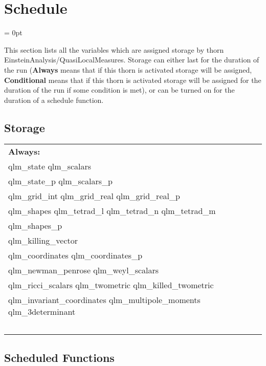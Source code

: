
\section{Schedule} 


\parskip = 0pt


\noindent This section lists all the variables which are assigned storage by thorn EinsteinAnalysis/QuasiLocalMeasures.  Storage can either last for the duration of the run ({\bf Always} means that if this thorn is activated storage will be assigned, {\bf Conditional} means that if this thorn is activated storage will be assigned for the duration of the run if some condition is met), or can be turned on for the duration of a schedule function.


\subsection*{Storage}

\hspace{5mm}

 \begin{tabular*}{160mm}{ll} 

{\bf Always:}&  ~ \\ 
 qlm\_state qlm\_scalars & ~\\ 
 qlm\_state\_p qlm\_scalars\_p & ~\\ 
 qlm\_grid\_int qlm\_grid\_real qlm\_grid\_real\_p & ~\\ 
 qlm\_shapes qlm\_tetrad\_l qlm\_tetrad\_n qlm\_tetrad\_m & ~\\ 
 qlm\_shapes\_p & ~\\ 
 qlm\_killing\_vector & ~\\ 
 qlm\_coordinates qlm\_coordinates\_p & ~\\ 
 qlm\_newman\_penrose qlm\_weyl\_scalars & ~\\ 
 qlm\_ricci\_scalars qlm\_twometric qlm\_killed\_twometric & ~\\ 
 qlm\_invariant\_coordinates qlm\_multipole\_moments qlm\_3determinant & ~\\ 
~ & ~\\ 
\end{tabular*} 


\subsection*{Scheduled Functions}
\vspace{5mm}


